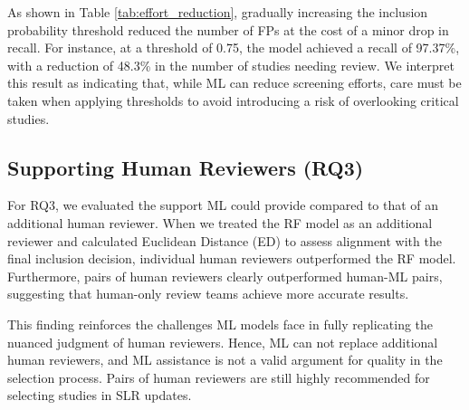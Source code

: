 As shown in Table \ref{tab:effort_reduction}, gradually increasing the inclusion probability threshold reduced the number of FPs at the cost of a minor drop in recall. For instance, at a threshold of 0.75, the model achieved a recall of 97.37\%, with a reduction of 48.3\% in the number of studies needing review. We interpret this result as indicating that, while ML can reduce screening efforts, care must be taken when applying thresholds to avoid introducing a risk of overlooking critical studies.

\subsection{Supporting Human Reviewers (RQ3)}

For RQ3, we evaluated the support ML could provide compared to that of an additional human reviewer. When we treated the RF model as an additional reviewer and calculated Euclidean Distance (ED) to assess alignment with the final inclusion decision, individual human reviewers outperformed the RF model. Furthermore, pairs of human reviewers clearly outperformed human-ML pairs, suggesting that human-only review teams achieve more accurate results.

This finding reinforces the challenges ML models face in fully replicating the nuanced judgment of human reviewers. Hence, ML can not replace additional human reviewers, and ML assistance is not a valid argument for quality in the selection process. Pairs of human reviewers are still highly recommended for selecting studies in SLR updates.